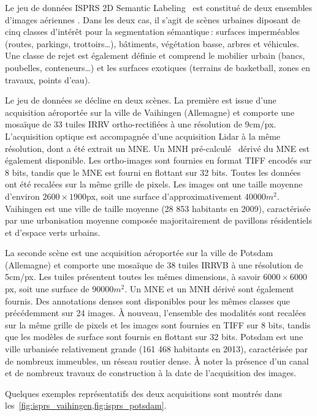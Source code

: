 Le jeu de données ISPRS 2D Semantic Labeling~\cite{rottensteiner_isprs_2012} est constitué de deux ensembles d'images aériennes . Dans les deux cas, il s'agit de scènes urbaines diposant de cinq classes d'intérêt pour la segmentation sémantique\,: surfaces imperméables (routes, parkings, trottoirs\dots), bâtiments, végétation basse, arbres et véhicules. Une classe de rejet est également définie et comprend le mobilier urbain (bancs, poubelles, conteneurs\dots) et les surfaces exotiques (terrains de basketball, zones en travaux, points d'eau).

Le jeu de données se décline en deux scènes. La première est issue d'une acquisition aéroportée sur la ville de Vaihingen (Allemagne) et comporte une mosaïque de 33 tuiles \gls{IRRV} ortho-rectifiées à une résolution de 9cm/px. L'acquisition optique est accompagnée d'une acquisition \gls{Lidar} à la même résolution, dont a été extrait un \gls{MNE}. Un \gls{MNH} pré-calculé~\cite{gerke_use_2015} dérivé du \gls{MNE} est également disponible. Les ortho-images sont fournies en format \gls{TIFF} encodés sur 8 bits, tandis que le \gls{MNE} est fourni en flottant sur 32 bits. Toutes les données ont été recalées sur la même grille de pixels. Les images ont une taille moyenne d'environ $2600\times1900$px, soit une surface d'approximativement $40 000m^2$. Vaihingen est une ville de taille moyenne (28 853 habitants en 2009), caractérisée par une urbanisation moyenne composée majoritairement de pavillons résidentiels et d'espace verts urbains.

La seconde scène est une acquisition aéroportée sur la ville de Potsdam (Allemagne) et comporte une mosaïque de 38 tuiles \gls{IRRVB} à une résolution de 5cm/px. Les tuiles présentent toutes les mêmes dimensions, à savoir $6000\times6000$px, soit une surface de $90 000m^2$. Un \gls{MNE} et un \gls{MNH} dérivé sont également fournis. Des annotations denses sont disponibles pour les mêmes classes que précédemment sur 24 images. À nouveau, l'ensemble des modalités sont recalées sur la même grille de pixels et les images sont fournies en \gls{TIFF} sur 8 bits, tandis que les modèles de surface sont fournis en flottant sur 32 bits. Potsdam est une ville urbanisée relativement grande (161 468 habitants en 2013), caractérisée par de nombreux immeubles, un réseau routier dense. À noter la présence d'un canal et de nombreux travaux de construction à la date de l'acquisition des images.

Quelques exemples représentatifs des deux acquisitions sont montrés dans les~\cref{fig:isprs_vaihingen,fig:isprs_potsdam}.

